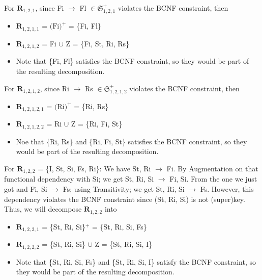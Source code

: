 \documentclass[12pt]{article}
\begin{document}
\begin{enumerate}
        For $\textbf{R}_{1,2,1}$, since Fi $\longrightarrow$ Fl $\in
        \mathfrak{S}_{1,2,1}^+$ violates the BCNF constraint, then
        \begin{itemize}
          \item $\textbf{R}_{1,2,1,1}$ = $\text{(Fi)}^+$
                                       = \{Fi, Fl\}
          \item $\textbf{R}_{1,2,1,2}$ = Fi $\cup$ Z
                                       = \{Fi, St, Ri, Rs\}
          \item Note that \{Fi, Fl\} satisfies the BCNF constraint, so they
                would be part of the resulting decomposition.
        \end{itemize}

        For $\textbf{R}_{1,2,1,2}$, since Ri $\longrightarrow$ Rs $\in
        \mathfrak{S}_{1,2,1,2}^+$ violates the BCNF constraint, then
        \begin{itemize}
          \item $\textbf{R}_{1,2,1,2,1}$ = $\text{(Ri)}^+$
                                         = \{Ri, Rs\}
          \item $\textbf{R}_{1,2,1,2,2}$ = Ri $\cup$ Z
                                         = \{Ri, Fi, St\}
          \item Noe that \{Ri, Rs\} and \{Ri, Fi, St\} satisfies the BCNF
                constraint, so they would be part of the resulting
                decomposition.
        \end{itemize}

        For $\textbf{R}_{1,2,2}$ = \{I, St, Si, Fs, Ri\}: We have St, Ri
        $\longrightarrow$ Fi. By Augmentation on that functional dependency with
        Si; we get St, Ri, Si $\longrightarrow$ Fi, Si. From the one we just got
        and Fi, Si $\longrightarrow$ Fs; using Transitivity; we get St, Ri, Si
        $\longrightarrow$ Fs. However, this dependency violates the BCNF
        constraint since (St, Ri, Si) is not (super)key. Thus, we will decompose 
        $\textbf{R}_{1,2,2}$ into
        \begin{itemize}
          \item $\textbf{R}_{1,2,2,1}$ = \{St, Ri, Si\}$^+$
                                       = \{St, Ri, Si, Fs\}
          \item $\textbf{R}_{1,2,2,2}$ = \{St, Ri, Si\} $\cup$ Z
                                       = \{St, Ri, Si, I\}
          \item Note that \{St, Ri, Si, Fs\} and \{St, Ri, Si, I\} satisfy the
                BCNF constraint, so they would be part of the resulting
                decomposition.
        \end{itemize}


\end{enumerate}
\end{document}
